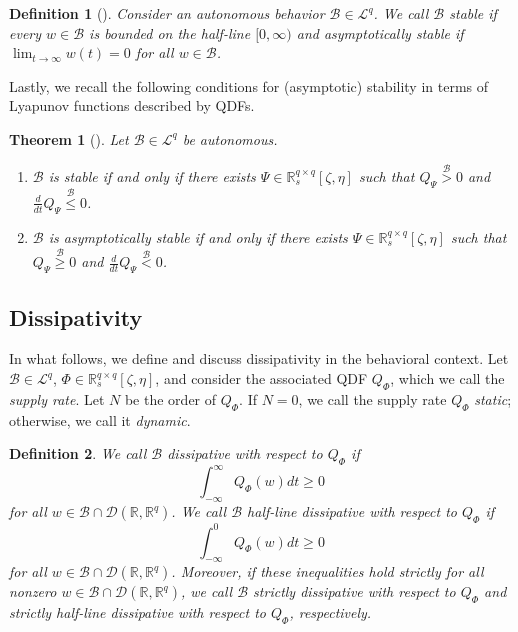 \documentclass[letterpaper, 10 pt, conference]{ieeeconf}
\theoremstyle{ieeeconf}
\newtheorem{theorem}{Theorem}
\newtheorem{definition}{Definition}
\newcommand{\R}{\mathbb{R}}
\newcommand{\D}{\mathcal{D}}
\newcommand{\B}{\mathcal{B}}
\begin{document}
\begin{definition}[\hspace{-0.01ex}\cite{willems_quadratic_1998}] Consider an autonomous behavior ${\B \in \mathcal{L}^q}$. We call $\B$ \emph{stable} if every $w\in \B$ is bounded on the half-line $[0, \infty)$ and \emph{asymptotically stable} if ${\lim_{t \to \infty}w(t)=0}$ for all $w\in \mathcal{B}$. 
\end{definition}

Lastly, we recall the following conditions for (asymptotic) stability in terms of Lyapunov functions described by QDFs.
\begin{theorem}[\hspace{-0.01ex}\cite{willems_quadratic_1998}]
	Let ${\B \in \mathcal{L}^q}$ be autonomous.
	\begin{enumerate}[label=\roman*)]
		\item  $\B$ is stable if and only if there exists $\Psi \in \R_s^{q \times q}[\zeta, \eta]$ such that $Q_\Psi \stackrel{\mathcal{B}}{>} 0$ and $\frac{d}{dt}Q_\Psi \stackrel{\mathcal{B}}{\leq} 0$.
		\item $\B$ is asymptotically stable if and only if there exists $\Psi \in \R_s^{q \times q}[\zeta, \eta]$ such that $Q_\Psi \stackrel{\mathcal{B}}{\geq} 0$ and $\frac{d}{dt}Q_\Psi \stackrel{\mathcal{B}}{<} 0$.
	\end{enumerate}
	\label{t: lyap stab}
\end{theorem}

\subsection{Dissipativity}
In what follows, we define and discuss dissipativity in the behavioral context. Let $\B \in \mathcal{L}^q$, $\Phi \in \R_s^{q \times q}[\zeta,\eta]$, and consider the associated QDF $Q_\Phi$, which we call the \emph{supply rate}. Let $N$ be the order of $Q_\Phi$. If $N=0$, we call the supply rate $Q_\Phi$ \emph{static}; otherwise, we call it \emph{dynamic}.
\begin{definition}
	We call $\B$ \emph{dissipative} with respect to $Q_\Phi$ if
	\begin{equation*}
		\int_{-\infty}^\infty Q_\Phi(w)dt \geq 0 
	\end{equation*}
	for all $w\in \B \cap \mathcal{D}(\R,\R^q)$. We call $\B$ \emph{half-line dissipative} with respect to $Q_\Phi$ if
	\vspace{-0.5ex}
	\begin{equation*}
		\int_{-\infty}^0 Q_\Phi(w)dt \geq 0 
	\end{equation*}
	for all $w\in \B \cap \mathcal{D}(\R,\R^q)$. Moreover, if these inequalities hold strictly for all nonzero $w \in \B \cap \D(\R,\R^q)$, we call $\B$ \emph{strictly dissipative} with respect to $Q_\Phi$ and \emph{strictly half-line dissipative} with respect to $Q_\Phi$, respectively. 
\end{definition}
\end{document}
